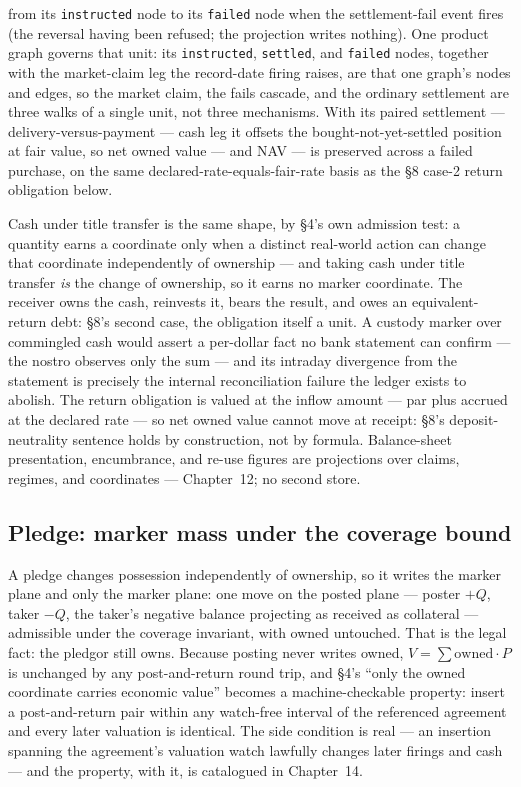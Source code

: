 from its \texttt{instructed} node to its \texttt{failed} node when the settlement-fail
event fires (the reversal having been refused; the projection writes nothing). One
product graph governs that unit: its \texttt{instructed}, \texttt{settled}, and
\texttt{failed} nodes, together with the market-claim leg the record-date firing raises,
are that one graph's nodes and edges, so the market claim, the fails cascade, and the
ordinary settlement are three walks of a single unit, not three mechanisms. With its
paired settlement --- delivery-versus-payment --- cash leg it offsets the
bought-not-yet-settled position at fair value, so net owned value --- and NAV --- is
preserved across a failed purchase, on the same declared-rate-equals-fair-rate basis as
the \S8 case-2 return obligation below.

Cash under title transfer is the same shape, by \S4's own admission test: a
quantity earns a coordinate only when a distinct real-world action can change
that coordinate independently of ownership --- and taking cash under title
transfer \emph{is} the change of ownership, so it earns no marker coordinate.
The receiver owns the cash, reinvests it, bears the result, and owes an
equivalent-return debt: \S8's second case, the obligation itself a unit. A
custody marker over commingled cash would assert a per-dollar fact no bank
statement can confirm --- the nostro observes only the sum --- and its
intraday divergence from the statement is precisely the internal
reconciliation failure the ledger exists to abolish. The return obligation is
valued at the inflow amount --- par plus accrued at the declared rate --- so
net owned value cannot move at receipt: \S8's deposit-neutrality sentence
holds by construction, not by formula. Balance-sheet presentation, encumbrance,
and re-use figures are projections over claims, regimes, and coordinates ---
Chapter~12; no second store.

\subsection{Pledge: marker mass under the coverage bound}

A pledge changes possession independently of ownership, so it writes the
marker plane and only the marker plane: one move on the posted plane ---
poster $+Q$, taker $-Q$, the taker's negative balance projecting as received
as collateral --- admissible under the coverage invariant, with owned
untouched. That is the legal fact: the pledgor still owns. Because posting
never writes owned, $V=\sum \mathrm{owned}\cdot P$ is unchanged by any
post-and-return round trip, and \S4's ``only the owned coordinate carries
economic value'' becomes a machine-checkable property: insert a
post-and-return pair within any watch-free interval of the referenced
agreement and every later valuation is identical. The side condition is real
--- an insertion spanning the agreement's valuation watch lawfully changes
later firings and cash --- and the property, with it, is catalogued in
Chapter~14.

